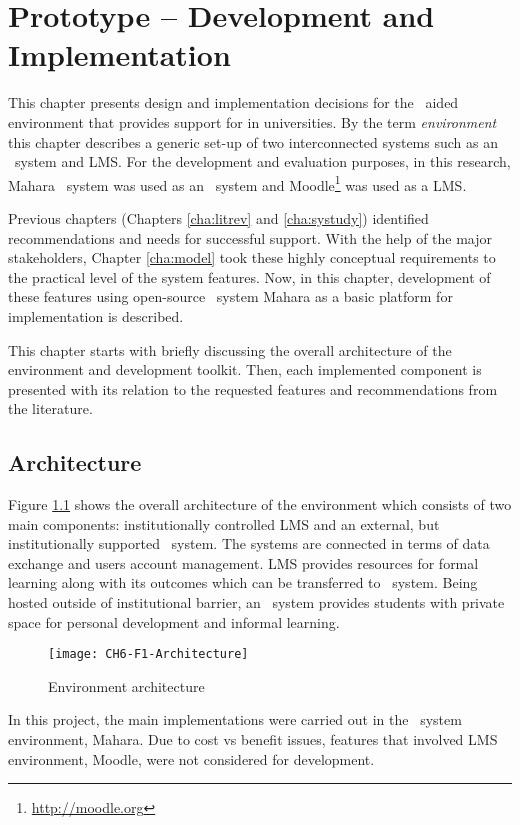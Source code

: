 \chapter{Prototype -- Development and Implementation\label{cha:prototype}}
This chapter presents design and implementation decisions for the \ep~aided
environment that provides support for \LLLs in universities. By the term
\textit{environment} this chapter describes a generic set-up of two
interconnected systems such as an \ep~system and LMS. For the development and
evaluation purposes, in this research, Mahara \ep~system was used as an
\ep~system and Moodle\footnote{\url{http://moodle.org}} was used as a LMS.

Previous chapters (Chapters \ref{cha:litrev} and \ref{cha:systudy}) identified
recommendations and needs for successful \LLLs support. With the help of the
major stakeholders, Chapter \ref{cha:model} took these highly conceptual
requirements to the practical level of the system features. Now, in this
chapter, development of these features using open-source \ep~system Mahara as a
basic platform for implementation is described.

This chapter starts with briefly discussing the overall architecture of the
environment and development toolkit. Then, each implemented component is
presented with its relation to the requested features and \LLLs recommendations
from the literature.

\section{Architecture}

Figure \ref{fig:arch} shows the overall architecture of the environment which
consists of two main components: institutionally controlled LMS and an external,
but institutionally supported \ep~system. The systems are connected in terms of
data exchange and users account management. LMS provides resources for formal
learning along with its outcomes which can be transferred to \ep~system. Being
hosted outside of institutional barrier, an \ep~system provides students with
private space for personal development and informal learning.

\begin{figure}[htp]
\centering
\texttt{[image: CH6-F1-Architecture]}
\caption{Environment architecture}
\label{fig:arch}
\end{figure}

In this project, the main implementations were carried out in the \ep~system
environment, Mahara. Due to cost vs benefit issues, features that involved LMS
environment, Moodle, were not considered for development. 

